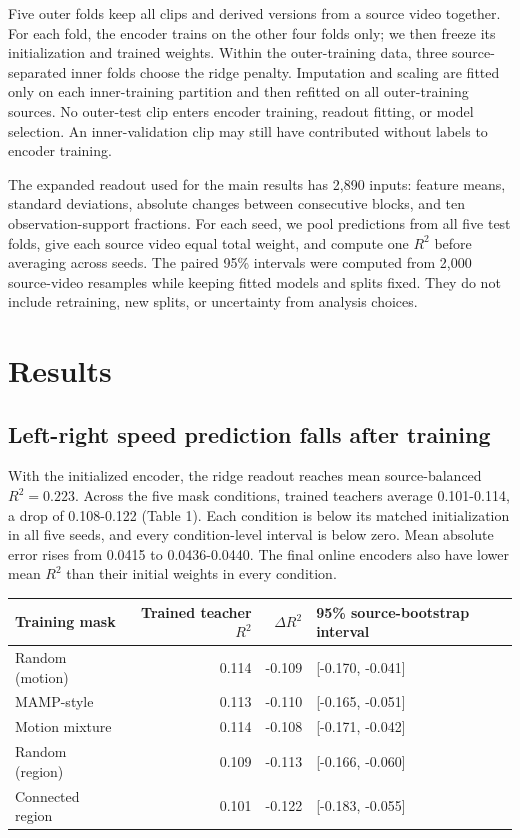 \documentclass{article}
\begin{document}
Five outer folds keep all clips and derived versions from a source video
together. For each fold, the encoder trains on the other four folds
only; we then freeze its initialization and trained weights. Within the
outer-training data, three source-separated inner folds choose the ridge
penalty. Imputation and scaling are fitted only on each inner-training
partition and then refitted on all outer-training sources. No outer-test
clip enters encoder training, readout fitting, or model selection. An
inner-validation clip may still have contributed without labels to
encoder training.

The expanded readout used for the main results has 2,890 inputs: feature
means, standard deviations, absolute changes between consecutive blocks,
and ten observation-support fractions. For each seed, we pool
predictions from all five test folds, give each source video equal total
weight, and compute one \(R^2\) before averaging across seeds. The
paired 95\% intervals were computed from 2,000 source-video resamples
while keeping fitted models and splits fixed. They do not include
retraining, new splits, or uncertainty from analysis choices.

\section{Results}\label{results}

\subsection{Left-right speed prediction falls after
training}\label{left-right-speed-prediction-falls-after-training}

With the initialized encoder, the ridge readout reaches mean
source-balanced \(R^2=0.223\). Across the five mask conditions, trained
teachers average 0.101-0.114, a drop of 0.108-0.122 (Table 1). Each
condition is below its matched initialization in all five seeds, and
every condition-level interval is below zero. Mean absolute error rises
from 0.0415 to 0.0436-0.0440. The final online encoders also have lower
mean \(R^2\) than their initial weights in every condition.

\begin{center}
\begin{tabular}{lrrl}
\toprule
Training mask & Trained teacher $R^2$ & $\Delta R^2$ & 95\% source-bootstrap interval \\
\midrule
Random (motion) & 0.114 & -0.109 & [-0.170, -0.041] \\
MAMP-style & 0.113 & -0.110 & [-0.165, -0.051] \\
Motion mixture & 0.114 & -0.108 & [-0.171, -0.042] \\
Random (region) & 0.109 & -0.113 & [-0.166, -0.060] \\
Connected region & 0.101 & -0.122 & [-0.183, -0.055] \\
\bottomrule
\end{tabular}
\end{center}
\end{document}
